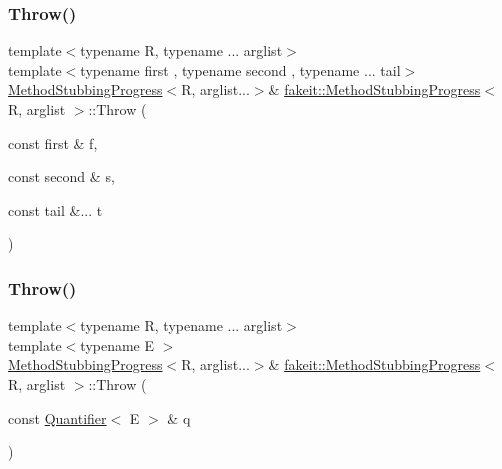 \mbox{\label{structfakeit_1_1MethodStubbingProgress_a516a0ade529c61e4ab6df1bf47f3f1b2}} 
\subsubsection{\texorpdfstring{Throw()}{Throw()}\hspace{0.1cm}{\footnotesize\ttfamily [17/27]}}
{\footnotesize\ttfamily template$<$typename R, typename ... arglist$>$ \\
template$<$typename first , typename second , typename ... tail$>$ \\
\mbox{\hyperlink{structfakeit_1_1MethodStubbingProgress}{Method\+Stubbing\+Progress}}$<$R, arglist...$>$\& \mbox{\hyperlink{structfakeit_1_1MethodStubbingProgress}{fakeit\+::\+Method\+Stubbing\+Progress}}$<$ R, arglist $>$\+::Throw (\begin{DoxyParamCaption}\item[{const first \&}]{f,  }\item[{const second \&}]{s,  }\item[{const tail \&...}]{t }\end{DoxyParamCaption})\hspace{0.3cm}{\ttfamily [inline]}}

\mbox{\label{structfakeit_1_1MethodStubbingProgress_a93c74210adfc0ec4662aff15f78834c7}} 
\subsubsection{\texorpdfstring{Throw()}{Throw()}\hspace{0.1cm}{\footnotesize\ttfamily [18/27]}}
{\footnotesize\ttfamily template$<$typename R, typename ... arglist$>$ \\
template$<$typename E $>$ \\
\mbox{\hyperlink{structfakeit_1_1MethodStubbingProgress}{Method\+Stubbing\+Progress}}$<$R, arglist...$>$\& \mbox{\hyperlink{structfakeit_1_1MethodStubbingProgress}{fakeit\+::\+Method\+Stubbing\+Progress}}$<$ R, arglist $>$\+::Throw (\begin{DoxyParamCaption}\item[{const \mbox{\hyperlink{structfakeit_1_1Quantifier}{Quantifier}}$<$ E $>$ \&}]{q }\end{DoxyParamCaption})\hspace{0.3cm}{\ttfamily [inline]}}

